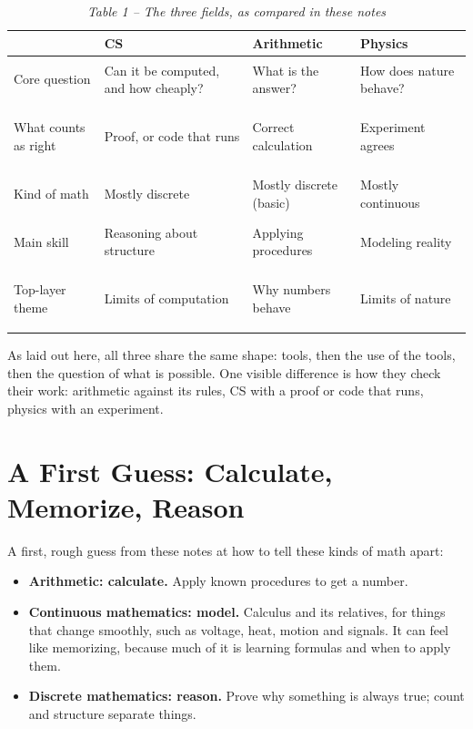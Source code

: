 \documentclass[11pt,a4paper]{article}
\begin{document}
\begin{table}[H]
\centering
\caption*{\itshape Table 1 -- The three fields, as compared in these notes}
\small
\begin{tabularx}{\textwidth}{@{}>{\bfseries\raggedright}L{0.18\textwidth}YYY@{}}
\toprule
 & \textbf{CS} & \textbf{Arithmetic} & \textbf{Physics} \\
\midrule
Core question & Can it be computed, and how cheaply? & What is the answer? & How does nature behave? \\[0.4em]
What counts as right & Proof, or code that runs & Correct calculation & Experiment agrees \\[0.4em]
Kind of math & Mostly discrete & Mostly discrete (basic) & Mostly continuous \\[0.4em]
Main skill & Reasoning about structure & Applying procedures & Modeling reality \\[0.4em]
Top-layer theme & Limits of computation & Why numbers behave & Limits of nature \\
\bottomrule
\end{tabularx}
\end{table}

\newpage %
As laid out here, all three share the same shape: tools, then the use of the tools, then the
question of what is possible. One visible difference is how they check their work: arithmetic
against its rules, CS with a proof or code that runs, physics with an experiment.

\section{A First Guess: Calculate, Memorize, Reason}

A first, rough guess from these notes at how to tell these kinds of math apart:

\begin{itemize}
  \item \textbf{Arithmetic: calculate.} Apply known procedures to get a number.
  \item \textbf{Continuous mathematics: model.} Calculus and its relatives, for things that change
        smoothly, such as voltage, heat, motion and signals. It can feel like memorizing, because
        much of it is learning formulas and when to apply them.
  \item \textbf{Discrete mathematics: reason.} Prove why something is always true; count and structure
        separate things.
\end{itemize}
\end{document}
